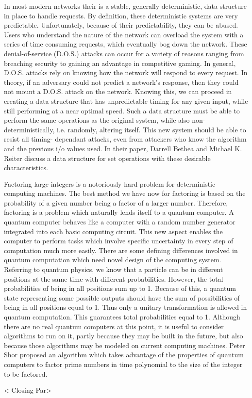 \documentclass{paper}
\begin{document}
In most modern networks their is a stable, generally deterministic, data
structure in place to handle requests. By definition, these
deterministic systems are very predictable. Unfortunately, because of their
predictability, they can be abused. Users who understand the nature of 
the network can overload the system with a series of time consuming
requests, which eventually bog down the network. These denial-of-service
(D.O.S.) attacks can occur for a variety of reasons ranging from 
breaching security to gaining an advantage in competitive gaming. In 
general, D.O.S. attacks rely on knowing how the network will respond to 
every request. In theory, if an adversary could not predict a network's 
response, then they could not mount a D.O.S. attack on the network. 
Knowing this, we can proceed in 
creating a data structure that has unpredictable timing 
for any given input, while still performing at a near optimal speed. 
Such a data structure must be able to perform the same operations as 
the original system, while also non-deterministically, i.e. randomly, 
altering itself. This new system should be able to resist all timing-
dependant attacks,
even from attackers who know the algorithm and the previous i/o values used.
In their paper, Darrell Bethea and Michael K. Reiter discuss a data
structure for set operations with these desirable characteristics.

Factoring large  integers is a notoriously hard problem for deterministic 
computing machines. The best method we have now  for factoring is based 
on the probability of a given number being a factor of a larger number. 
Therefore, factoring is a problem which naturally lends itself to a
quantum computer. A quantum computer behaves like a computer with a 
random number generator integrated into each basic computing circuit.
This new aspect enables the computer to perform tasks which involve 
specific uncertainty in every step of computation much more easily.
There are some defining differences involved in quantum computation
which need novel design of the computing system. Referring to quantum
physics, we know that a particle can be in 
different positions at the same time with different probabilities. 
However, the total probabilities of being in all positions sum up to 1. 
Because of this, a quantum state representing some possible outputs
should have the sum of possibilities of being in all positions equal to
1. Thus only a unitary transformation is allowed in quantum computation.
This guarantees total probabilities equal to 1. Although there are no
real quantum computers at this point, it is useful to consider algorithms
to run on it, partly because they may be built in the future, but also
because those algorithms may be modeled on current computing machines.
Peter Shor proposed an algorithm which takes advantage of the properties
of quantum computers to factor prime numbers in time polynomial to the
size of the integer to be factored.


< Closing Par>
\end{document}
